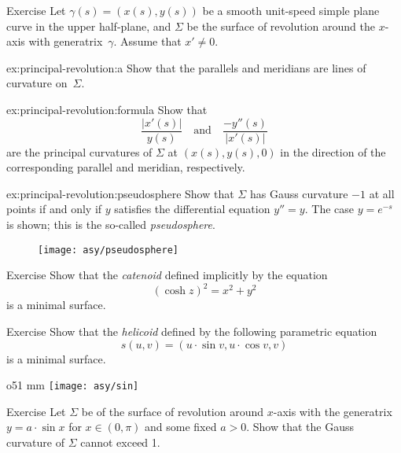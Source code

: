 \begin{thm}{Exercise}\label{ex:principal-revolution}
Let $\gamma(s)=(x(s),y(s))$ be a smooth unit-speed simple plane curve in the upper half-plane,
and $\Sigma$ be the surface of revolution around the $x$-axis with generatrix~$\gamma$.
Assume that $x'\ne 0$.

\begin{subthm}{ex:principal-revolution:a}
Show that the parallels and meridians are lines of curvature on~$\Sigma$.
\end{subthm}

\begin{subthm}{ex:principal-revolution:formula}
Show that 
\[\frac{|x'(s)|}{y(s)}
\quad
\text{and}
\quad
\frac{-y''(s)}{|x'(s)|}
\]
are the principal curvatures of $\Sigma$ at $(x(s),y(s),0)$ in the direction of the corresponding parallel and meridian, respectively.
\end{subthm}

\begin{subthm}{ex:principal-revolution:pseudosphere}
Show that $\Sigma$ has Gauss curvature $-1$ at all points if and only if $y$ satisfies the differential equation $y''=y$. 
The case $y=e^{-s}$ is shown; this is the so-called \emph{pseudosphere}.
\end{subthm}

\end{thm}

\begin{figure}[ht!]
\vskip-3mm
\hskip30mm
\texttt{[image: asy/pseudosphere]}
\vskip-3mm
\end{figure}

\begin{thm}{Exercise}\label{ex:catenoid-is-minimal}
Show that the \emph{catenoid} defined implicitly by the equation
\[(\cosh z)^2=x^2+y^2\]
is a minimal surface.
\end{thm}

\begin{thm}{Exercise}\label{ex:helicoid-is-minimal}
Show that the \emph{helicoid} defined by the following parametric equation
\[s(u,v)=(u\cdot \sin v,u\cdot \cos v,v)\]
is a minimal surface.
\end{thm}

\begin{wrapfigure}{o}{51 mm}
\vskip-6mm
\centering
\texttt{[image: asy/sin]}
\vskip-2mm
\end{wrapfigure}

\begin{thm}{Exercise}\label{ex:rev(sin)}
Let $\Sigma$ be of the surface of revolution around $x$-axis
with the generatrix $y=a\cdot \sin x$ for $x\in (0,\pi)$ and some fixed $a>0$.
Show that the Gauss curvature of $\Sigma$ cannot exceed 1.
\end{thm}

